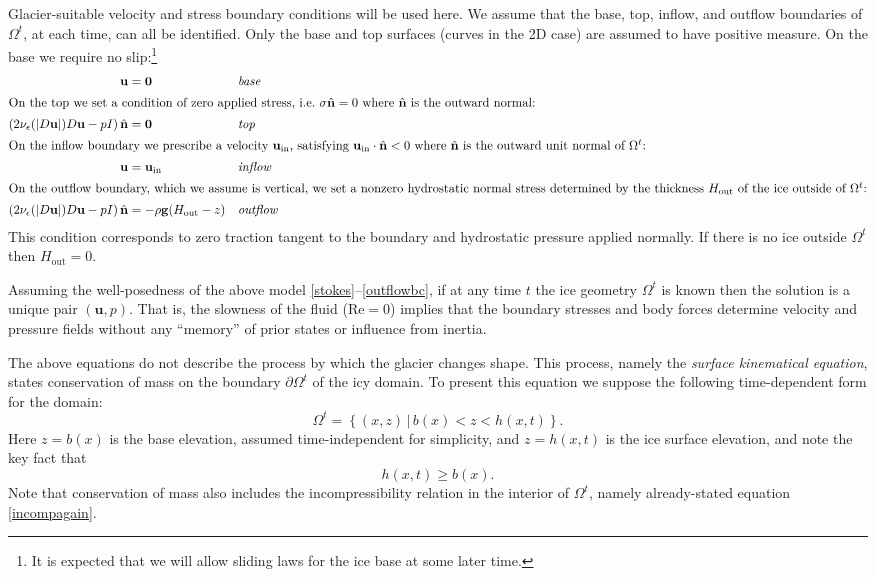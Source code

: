 \documentclass[letterpaper,final,12pt,reqno]{amsart}
\newcommand{\eps}{\epsilon}
\newcommand{\hbn}{\hat{\mathbf{n}}}
\newcommand{\bg}{\mathbf{g}}
\newcommand{\bu}{\mathbf{u}}
\newcommand{\bzero}{\bm{0}}
\begin{document}
Glacier-suitable velocity and stress boundary conditions will be used here.  We assume that the base, top, inflow, and outflow boundaries of $\Omega^t$, at each time, can all be identified.  Only the base and top surfaces (curves in the 2D case) are assumed to have positive measure.   On the base we require no slip:\footnote{It is expected that we will allow sliding laws for the ice base  \cite{JouvetRappaz2011} at some later time.}
\begin{align}
\bu &= \bzero  &&\text{\emph{base}} \label{basebc} \\
\intertext{On the top we set a condition of zero applied stress, i.e.~$\sigma\hbn=0$ where $\hbn$ is the outward normal:}
\left(2 \nu_\eps(|D\bu|) D\bu - pI\right) \hbn &= \bzero  &&\text{\emph{top}} \label{topbc} \\
\intertext{On the inflow boundary we prescribe a velocity $\bu_{\text{in}}$, satisfying $\bu_{\text{in}}\cdot \hbn < 0$ where $\hbn$ is the outward unit normal of $\Omega^t$:}
\bu &= \bu_{\text{in}}  &&\text{\emph{inflow}} \label{inflowbc} \\
\intertext{On the outflow boundary, which we assume is vertical, we set a nonzero hydrostatic normal stress determined by the thickness $H_{\text{out}}$ of the ice outside of $\Omega^t$:}
\left(2 \nu_\eps(|D\bu|) D\bu - pI\right) \hbn &= -\rho \bg (H_{\text{out}}-z) &&\text{\emph{outflow}} \label{outflowbc}
\end{align}
This condition corresponds to zero traction tangent to the boundary and hydrostatic pressure applied normally.  If there is no ice outside $\Omega^t$ then $H_{\text{out}}=0$.

Assuming the well-posedness \cite{JouvetRappaz2011} of the above model \eqref{stokes}--\eqref{outflowbc}, if at any time $t$ the ice geometry $\Omega^t$ is known then the solution is a unique pair $(\bu,p)$.  That is, the slowness of the fluid ($\text{Re}=0$) implies that the boundary stresses and body forces determine velocity and pressure fields without any ``memory'' of prior states or influence from inertia.

The above equations do not describe the process by which the glacier changes shape.  This process, namely the \emph{surface kinematical equation}, states conservation of mass on the boundary $\partial\Omega^t$ of the icy domain.  To present this equation we suppose the following time-dependent form for the domain:
\begin{equation}
\Omega^t = \left\{(x,z)\,\big|\, b(x) < z < h(x,t)\right\}.  \label{Omegat}
\end{equation}
Here $z=b(x)$ is the base elevation, assumed time-independent for simplicity, and $z=h(x,t)$ is the ice surface elevation, and note the key fact that
\begin{equation}
h(x,t) \ge b(x).  \label{admissibility}
\end{equation}
Note that conservation of mass also includes the incompressibility relation in the interior of $\Omega^t$, namely already-stated equation \eqref{incompagain}.
\end{document}
